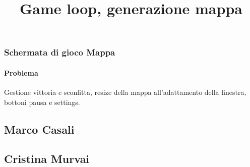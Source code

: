 \documentclass[a4paper,12pt]{report}
\begin{document}
\subsubsection{Schermata di gioco Mappa}
\paragraph{Problema} Gestione vittoria e sconfitta, resize della mappa all'adattamento della finestra, bottoni pausa e settings.

\subsection{Marco Casali}
\title{\textbf{Game loop, generazione mappa}}




\newpage
\subsection{Cristina Murvai}
\end{document}
